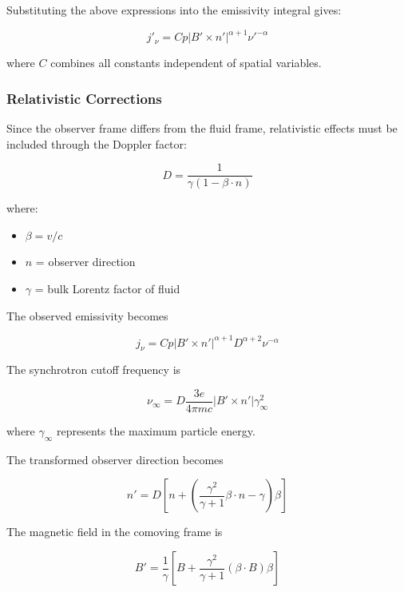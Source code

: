 \documentclass{article}
\begin{document}
Substituting the above expressions into the emissivity integral gives:

\begin{equation}
j'_{\nu}
=
Cp|B'\times n'|^{\alpha+1}
\nu'^{-\alpha}
\end{equation}

where $C$ combines all constants independent of spatial variables.

\subsubsection{Relativistic Corrections}

Since the observer frame differs from the fluid frame, relativistic effects must be included through the Doppler factor:

\begin{equation}
D
=
\frac{1}
{\gamma(1-\beta\cdot n)}
\end{equation}

where:

\begin{itemize}
\item $\beta=v/c$
\item $n$ = observer direction
\item $\gamma$ = bulk Lorentz factor of fluid
\end{itemize}

The observed emissivity becomes

\begin{equation}
j_\nu
=
Cp
|B'\times n'|^{\alpha+1}
D^{\alpha+2}
\nu^{-\alpha}
\end{equation}

The synchrotron cutoff frequency is

\begin{equation}
\nu_\infty
=
D
\frac{3e}{4\pi mc}
|B'\times n'|
\gamma_\infty^2
\end{equation}

where $\gamma_\infty$ represents the maximum particle energy.

The transformed observer direction becomes

\begin{equation}
n'
=
D
\left[
n+
\left(
\frac{\gamma^2}{\gamma+1}
\beta\cdot n
-\gamma
\right)\beta
\right]
\end{equation}

The magnetic field in the comoving frame is

\begin{equation}
B'
=
\frac{1}{\gamma}
\left[
B+
\frac{\gamma^2}{\gamma+1}
(\beta\cdot B)\beta
\right]
\end{equation}
\end{document}
